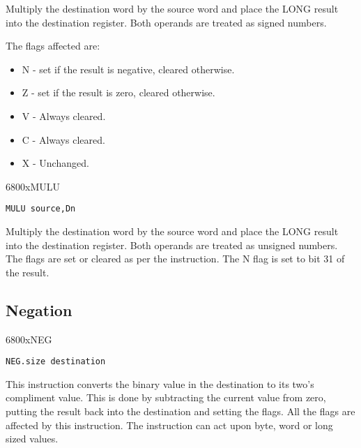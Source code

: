 Multiply the destination word by the source word and place the
      LONG result into the destination register. Both operands are treated as
      signed numbers.

The flags affected are:
\begin{itemize}[itemsep=0pt]

\item{}N -{} set if the result is negative, cleared otherwise.


\item{}Z -{} set if the result is zero, cleared otherwise.


\item{}V -{} Always cleared.


\item{}C -{} Always cleared.


\item{}X -{} Unchanged.

\end{itemize}

\mc6800x{MULU}
\begin{lstlisting}[firstnumber=1,]
          MULU source,Dn
\end{lstlisting}

Multiply the destination word by the source word and place the
      LONG result into the destination register. Both operands are treated as
      unsigned numbers. The flags are set or cleared as per the 
      instruction. The N flag is set to bit 31 of the result.

\subsection{Negation}\mc6800x{NEG}
\label{ch3-negation}%

\begin{lstlisting}[firstnumber=1,]
          NEG.size destination
\end{lstlisting}

This instruction converts the binary value in the destination to
      its two's compliment value. This is done by subtracting the current
      value from zero, putting the result back into the destination and setting
      the flags. All the flags are affected by this instruction. The
      instruction can act upon byte, word or long sized values.

